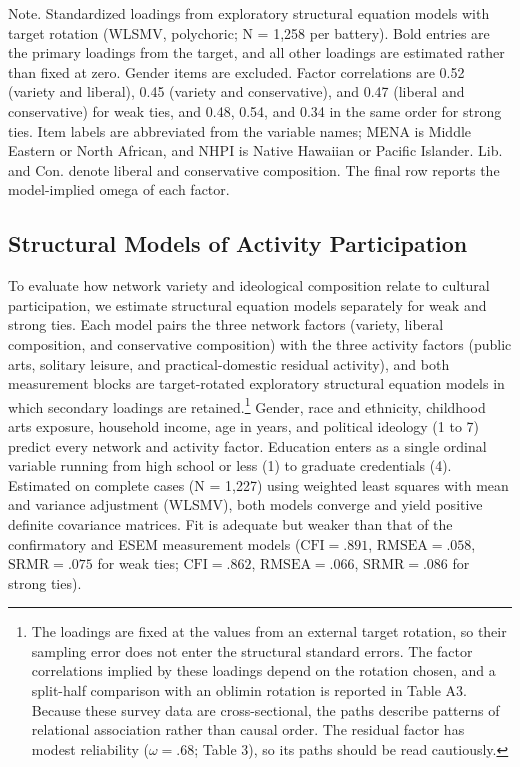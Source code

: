 \documentclass[
  12pt
]{article}
\begin{document}
Note. Standardized loadings from exploratory structural equation models with target rotation (WLSMV, polychoric; N = 1,258 per battery). Bold entries are the primary loadings from the target, and all other loadings are estimated rather than fixed at zero. Gender items are excluded. Factor correlations are 0.52 (variety and liberal), 0.45 (variety and conservative), and 0.47 (liberal and conservative) for weak ties, and 0.48, 0.54, and 0.34 in the same order for strong ties. Item labels are abbreviated from the variable names; MENA is Middle Eastern or North African, and NHPI is Native Hawaiian or Pacific Islander. Lib. and Con. denote liberal and conservative composition. The final row reports the model-implied omega of each factor.


\subsection{Structural Models of Activity Participation}\label{structural-models-of-activity-participation}

To evaluate how network variety and ideological composition relate to cultural participation, we estimate structural equation models separately for weak and strong ties. Each model pairs the three network factors (variety, liberal composition, and conservative composition) with the three activity factors (public arts, solitary leisure, and practical-domestic residual activity), and both measurement blocks are target-rotated exploratory structural equation models in which secondary loadings are retained.\footnote{The loadings are fixed at the values from an external target rotation, so their sampling error does not enter the structural standard errors. The factor correlations implied by these loadings depend on the rotation chosen, and a split-half comparison with an oblimin rotation is reported in Table A3. Because these survey data are cross-sectional, the paths describe patterns of relational association rather than causal order. The residual factor has modest reliability ($\omega = .68$; Table 3), so its paths should be read cautiously.} Gender, race and ethnicity, childhood arts exposure, household income, age in years, and political ideology (1 to 7) predict every network and activity factor. Education enters as a single ordinal variable running from high school or less (1) to graduate credentials (4). Estimated on complete cases (N = 1,227) using weighted least squares with mean and variance adjustment (WLSMV), both models converge and yield positive definite covariance matrices. Fit is adequate but weaker than that of the confirmatory and ESEM measurement models ($\text{CFI} = .891$, $\text{RMSEA} = .058$, $\text{SRMR} = .075$ for weak ties; $\text{CFI} = .862$, $\text{RMSEA} = .066$, $\text{SRMR} = .086$ for strong ties).
\end{document}
